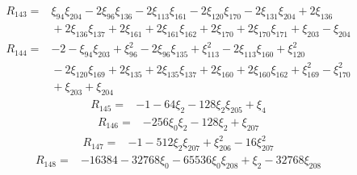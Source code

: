 \[
\begin{aligned}
 R_{143}={}&\xi_{94}\xi_{204}-2\xi_{96}\xi_{136}-2\xi_{113}\xi_{161}-2\xi_{120}\xi_{170}-2\xi_{131}\xi_{204}+2\xi_{136}\\
 &{}+2\xi_{136}\xi_{137}+2\xi_{161}+2\xi_{161}\xi_{162}+2\xi_{170}+2\xi_{170}\xi_{171}+\xi_{203}-\xi_{204}
\end{aligned}
\]
\[
\begin{aligned}
 R_{144}={}&-2-\xi_{94}\xi_{203}+\xi_{96}^{2}-2\xi_{96}\xi_{135}+\xi_{113}^{2}-2\xi_{113}\xi_{160}+\xi_{120}^{2}\\
 &{}-2\xi_{120}\xi_{169}+2\xi_{135}+2\xi_{135}\xi_{137}+2\xi_{160}+2\xi_{160}\xi_{162}+\xi_{169}^{2}-\xi_{170}^{2}\\
 &{}+\xi_{203}+\xi_{204}
\end{aligned}
\]
\[
\begin{aligned}
 R_{145}={}&-1-64\xi_{2}-128\xi_{2}\xi_{205}+\xi_{4}
\end{aligned}
\]
\[
\begin{aligned}
 R_{146}={}&-256\xi_{0}\xi_{2}-128\xi_{2}+\xi_{207}
\end{aligned}
\]
\[
\begin{aligned}
 R_{147}={}&-1-512\xi_{2}\xi_{207}+\xi_{206}^{2}-16\xi_{207}^{2}
\end{aligned}
\]
\[
\begin{aligned}
 R_{148}={}&-16384-32768\xi_{0}-65536\xi_{0}\xi_{208}+\xi_{2}-32768\xi_{208}
\end{aligned}
\]
\endgroup
